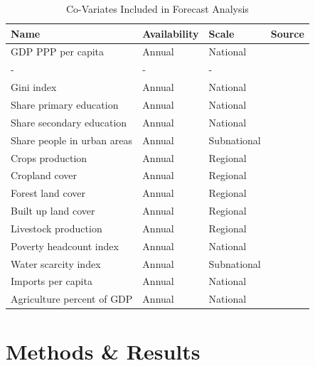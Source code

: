 \documentclass{article}
\begin{document}
\begin{table}[H]
	\begin{tabular}{llll}
		\toprule
		Name & Availability & Scale & Source \\
		\midrule
		GDP PPP per capita & Annual & National & \cite{Crespo2017} \\
		- & - & - & \cite{Dellink2017} \\
		Gini index & Annual & National & \cite{Rao2019a} \\
		Share primary education & Annual & National & \cite{KC2017} \\
		Share secondary education & Annual & National & \cite{KC2017} \\
		Share people in urban areas & Annual & Subnational & \cite{Jiang2017} \\
        Crops production & Annual & Regional & \cite{Jiang2017} \\
        Cropland cover & Annual & Regional & \cite{SSPData2017} \\
        Forest land cover & Annual & Regional & \cite{SSPData2017} \\
        Built up land cover & Annual & Regional & \cite{SSPData2017} \\
        Livestock production & Annual & Regional & \cite{SSPData2017} \\
        Poverty headcount index & Annual & National & \cite{WDL2020PC} \\
        Water scarcity index & Annual & Subnational & \cite{WDL2020WSC} \\
        Imports per capita & Annual & National & \cite{TheWorldBank2016} \\
        Agriculture percent of GDP & Annual & National & \cite{TheWorldBank2016} \\
        \bottomrule
	\end{tabular}
	\caption{Co-Variates Included in Forecast Analysis}
	\label{tab:covars3}
\end{table}



\section{Methods \& Results}
\end{document}
